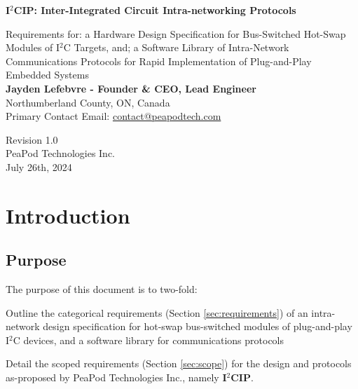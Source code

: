 \documentclass{../tex/report}
\begin{document}
\begin{titlepage}
    \begin{center}
        \vspace*{1.2cm}

        \textbf{\large{I${}^2$CIP: Inter-Integrated Circuit Intra-networking Protocols}}

        \vspace{0.5cm}

        Requirements for: a Hardware Design Specification for Bus-Switched Hot-Swap Modules of I${}^2$C Targets, and; a Software Library of Intra-Network Communications Protocols for Rapid Implementation of Plug-and-Play Embedded Systems\\

        \vfill
        \scriptsize{
            \textbf{Jayden Lefebvre - Founder \& CEO, Lead Engineer}\\
            Northumberland County, ON, Canada\\
        }
        \vspace{.75cm}
        Primary Contact Email: \uline{contact@peapodtech.com}
        \vspace{1.25cm}

        Revision 1.0\\
        PeaPod Technologies Inc.\\
        July 26th, 2024

    \end{center}
\end{titlepage}

\thispagestyle{plain}

\tableofcontents
\newpage

\section{Introduction}\label{sec:intro}

\subsection{Purpose}\label{sec:purpose}

The purpose of this document is to two-fold:

Outline the categorical requirements (Section \ref{sec:requirements}) of an intra-network design specification for hot-swap bus-switched modules of plug-and-play I${}^2$C devices, and a software library for communications protocols

Detail the scoped requirements (Section \ref{sec:scope}) for the design and protocols as-proposed by PeaPod Technologies Inc., namely \textbf{I${}^2$CIP}.
\end{document}
